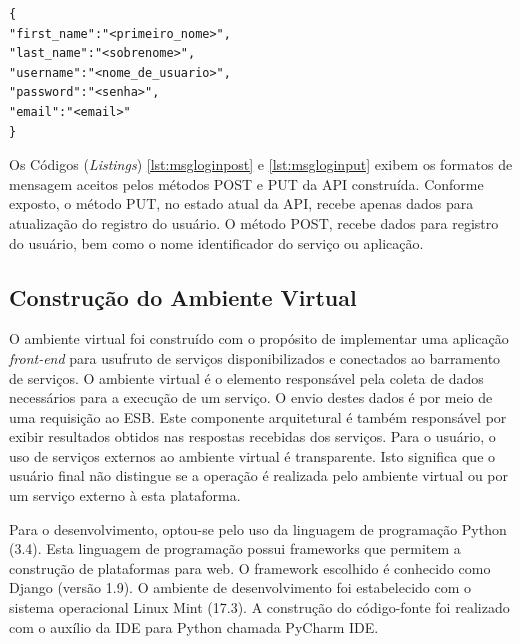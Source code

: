 
\begin{lstlisting}[caption={Formato de mensagem recebido pelo serviço de gerenciamento de usuários (método PUT).},label={lst:msgloginput}]
{
"first_name":"<primeiro_nome>",
"last_name":"<sobrenome>",
"username":"<nome_de_usuario>",
"password":"<senha>",
"email":"<email>"
}
\end{lstlisting}

Os Códigos (\textit{Listings}) \ref{lst:msgloginpost} e \ref{lst:msgloginput} exibem os formatos de mensagem aceitos pelos métodos POST e PUT da API construída. Conforme exposto, o método PUT, no estado atual da API, recebe apenas dados para atualização do registro do usuário. O método POST, recebe dados para registro do usuário, bem como o nome identificador do serviço ou aplicação.

\subsection{Construção do Ambiente Virtual}
O ambiente virtual foi construído com o propósito de implementar uma aplicação \textit{front-end} para usufruto de serviços disponibilizados e conectados ao barramento de serviços. O ambiente virtual é o elemento responsável pela coleta de dados necessários para a execução de um serviço. O envio destes dados é por meio de uma requisição ao ESB. Este componente arquitetural é também responsável por exibir resultados obtidos nas respostas recebidas dos serviços. Para o usuário, o uso de serviços externos ao ambiente virtual é transparente. Isto significa que o usuário final não distingue se a operação é realizada pelo ambiente virtual ou por um serviço externo à esta plataforma.

Para o desenvolvimento, optou-se pelo uso da linguagem de programação Python (3.4). Esta linguagem de programação possui frameworks que permitem a construção de plataformas para web. O framework escolhido é conhecido como Django (versão 1.9). O ambiente de desenvolvimento foi estabelecido com o sistema operacional Linux Mint (17.3). A construção do código-fonte foi realizado com o auxílio da IDE para Python chamada PyCharm IDE.

